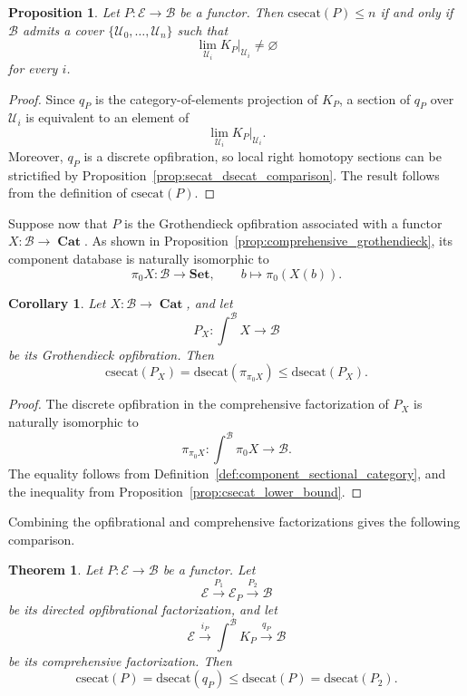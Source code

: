 \documentclass[12pt]{amsart}
\newtheorem{theorem}[teo]{Theorem}
\newtheorem{corollary}[teo]{Corollary}
\newtheorem{proposition}[teo]{Proposition}
\theoremstyle{definition}
\theoremstyle{remark}
\numberwithin{figure}{section}%
\newcommand{\Ba}{\mathcal{B}}
\newcommand{\cat}{\mathop{\mathbf{Cat}}}
\newcommand{\E}{\mathcal{E}}
\newcommand{\Sets}{\mathbf{Set}}
\newcommand{\Uc}{\mathcal{U}}
\begin{document}
\begin{proposition}\label{prop:csecat_local_limits}
Let \(P\colon\E\to\Ba\) be a functor. Then
\(\mathrm{csecat}(P)\leq n\) if and only if \(\Ba\) admits a cover
\(\{\Uc_0,\ldots,\Uc_n\}\) such that
\[
\lim_{\Uc_i}K_P|_{\Uc_i}
\neq
\varnothing
\]
for every \(i\).
\end{proposition}

\begin{proof}
Since \(q_P\) is the category-of-elements projection of \(K_P\), a section
of \(q_P\) over \(\Uc_i\) is equivalent to an element of
\[
\lim_{\Uc_i}K_P|_{\Uc_i}.
\]
Moreover, \(q_P\) is a discrete opfibration, so local right homotopy
sections can be strictified by
Proposition~\ref{prop:secat_dsecat_comparison}. The result follows from the
definition of \(\mathrm{csecat}(P)\).
\end{proof}

Suppose now that \(P\) is the Grothendieck opfibration associated with a
functor \(X\colon\Ba\to\cat\). As shown in
Proposition~\ref{prop:comprehensive_grothendieck}, its component database is
naturally isomorphic to
\[
\pi_0X\colon\Ba\longrightarrow\Sets,
\qquad
b\longmapsto\pi_0(X(b)).
\]

\begin{corollary}\label{cor:csecat_grothendieck}
Let \(X\colon\Ba\to\cat\), and let
\[
P_X\colon\int^\Ba X\longrightarrow\Ba
\]
be its Grothendieck opfibration. Then
\[
\mathrm{csecat}(P_X)
=
\mathrm{dsecat}(\pi_{\pi_0X})
\leq
\mathrm{dsecat}(P_X).
\]
\end{corollary}

\begin{proof}
The discrete opfibration in the comprehensive factorization of \(P_X\) is
naturally isomorphic to
\[
\pi_{\pi_0X}\colon
\int^\Ba\pi_0X
\longrightarrow
\Ba.
\]
The equality follows from
Definition~\ref{def:component_sectional_category}, and the inequality from
Proposition~\ref{prop:csecat_lower_bound}.
\end{proof}

Combining the opfibrational and comprehensive factorizations gives the
following comparison.

\begin{theorem}\label{thm:component_and_opfibrational_models}
Let \(P\colon\E\to\Ba\) be a functor. Let
\[
\E\xrightarrow{P_1}\E_P\xrightarrow{P_2}\Ba
\]
be its directed opfibrational factorization, and let
\[
\E\xrightarrow{i_P}\int^\Ba K_P\xrightarrow{q_P}\Ba
\]
be its comprehensive factorization. Then
\[
\mathrm{csecat}(P)
=
\mathrm{dsecat}(q_P)
\leq
\mathrm{dsecat}(P)
=
\mathrm{dsecat}(P_2).
\]
\end{theorem}
\end{document}
